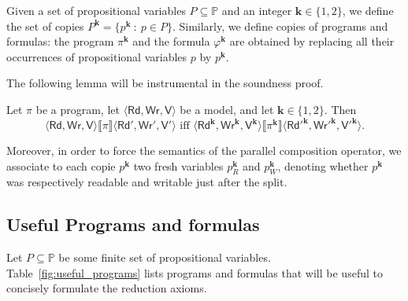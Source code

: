 \documentclass{llncs}
\newcommand{\cp}[2]{{#2}^\mathbf{#1}}
\newcommand{\cpr}[2]{\cp{#1}{#2}_R}
\newcommand{\cpw}[2]{\cp{#1}{#2}_W}
\newcommand{\readset}{\mathsf{Rd}}
\newcommand{\valuset}{\mathsf{V}}
\newcommand{\writeset}{\mathsf{Wr}}
\newcommand{\intPgm}[1]{\llbracket #1 \rrbracket}
\renewcommand{\phi}{\varphi}
\newcommand{\propset}{\mathbb P}
\newcommand{\propsetOf}[1]{\propset_{#1}}
\newcommand{\set}[1]{\{#1\}}
\newcommand{\suchthat}{~ : ~}
\newcommand{\tuple}[1]{ \langle #1 \rangle}
\begin{document}
Given a set of propositional variables $P \subseteq \propset$ and an integer $\mathbf{k} \in \set{1,2}$, we define the set of copies
$\cp{k} P = \{ \cp{k} p \suchthat p \in P\}$. 
Similarly, we define copies of programs and formulas:
the program $\cp{k} \pi$ and the formula $\cp{k} \phi$ are obtained by replacing all their occurrences of
propositional variables $p$ by $\cp k p$. 

The following lemma will be instrumental in the soundness proof. 

\begin{lemma}\label{theo:copies}
Let $\pi$ be a program, 
let $\tuple{\readset,\writeset,\valuset}$ be a model, and 
let $\mathbf{k} \in \set{1,2}$. 
Then 
$$ \tuple{\readset,\writeset,\valuset} \intPgm{\pi} \tuple{\readset',\writeset',\valuset'} \text{ iff } 
\tuple{ \cp k {\readset},\cp k {\writeset},\cp k {\valuset}} \intPgm{\cp k \pi} \tuple{\cp k {\readset'},\cp k {\writeset'},\cp k {\valuset'}} . $$
\end{lemma}

Moreover, in order to force the semantics of the parallel composition operator, we associate to each copie $\cp k p$ two fresh variables $\cpr k p$ and $\cpw k p$,
denoting whether $\cp k p$ was respectively readable and writable just after the split.


\subsection{Useful Programs and formulas}\label{sec:usefulFml}

Let $P \subseteq \propset$ be some finite set of propositional variables. 
Table~\ref{fig:useful_programs} lists programs and formulas that will be useful to concisely formulate the reduction axioms.
\end{document}
